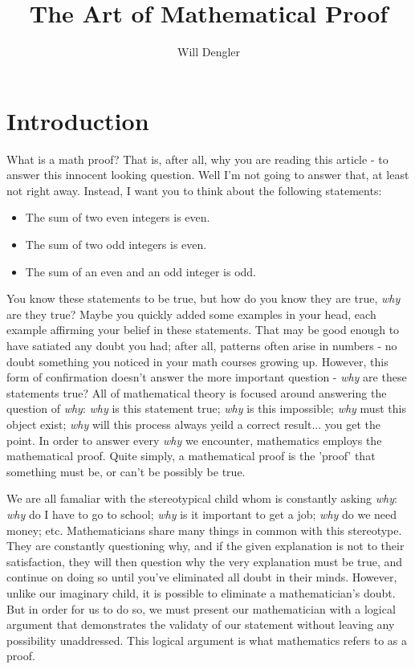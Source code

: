 \documentclass[a4paper,12pt]{article}
\begin{document}
\title{The Art of Mathematical Proof}
\author{Will Dengler}
\maketitle

\section{Introduction}
What is a math proof? That is, after all, why you are reading this article - to answer this innocent looking question. Well I'm not going to answer that, at least not right away. Instead, I want you to think about the following statements:
\begin{itemize}
	\item The sum of two even integers is even.
	\item The sum of two odd integers is even.
	\item The sum of an even and an odd integer is odd.
\end{itemize}

You know these statements to be true, but how do you know they are true, \textit{why} are they true? Maybe you quickly added some examples in your head, each example affirming your belief in these statements. That may be good enough to have satiated any doubt you had; after all, patterns often arise in numbers - no doubt something you noticed in your math courses growing up. However, this form of confirmation doesn't answer the more important question - \textit{why} are these statements true? All of mathematical theory is focused around answering the question of \textit{why}: \textit{why} is this statement true; \textit{why} is this impossible; \textit{why} must this object exist; \textit{why} will this process always yeild a correct result... you get the point. In order to answer every \textit{why} we encounter, mathematics employs the mathematical proof. Quite simply, a mathematical proof is the 'proof' that something must be, or can't be possibly be true. 

We are all famaliar with the stereotypical child whom is constantly asking \textit{why}: \textit{why} do I have to go to school; \textit{why} is it important to get a job; \textit{why} do we need money; etc. Mathematicians share many things in common with this stereotype. They are constantly questioning why, and if the given explanation is not to their satisfaction, they will then question why the very explanation must be true, and continue on doing so until you've eliminated all doubt in their minds. However, unlike our imaginary child, it is possible to eliminate a mathematician's doubt. But in order for us to do so, we must present our mathematician with a logical argument that demonstrates the validaty of our statement without leaving any possibility unaddressed. This logical argument is what mathematics refers to as a proof.  
  
\end{document}
